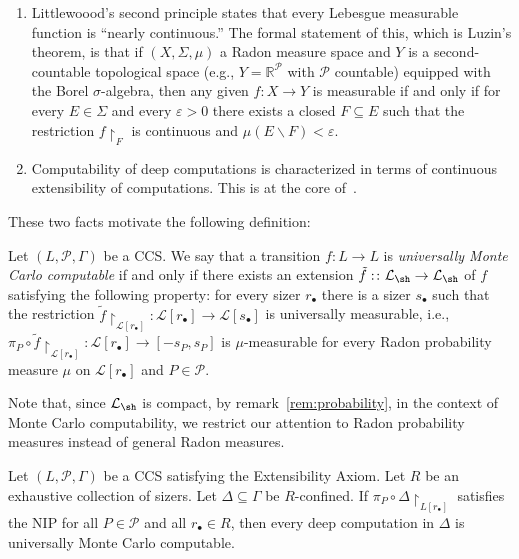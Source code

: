 \begin{enumerate}
    \item Littlewoood's second principle states that every Lebesgue measurable function is ``nearly continuous.''
The formal statement of this, which is Luzin's theorem, is that if $(X,\Sigma ,\mu )$ a Radon measure space and $Y$ is a second-countable topological space (e.g., $Y=\mathbb{R}^\mathcal{P}$ with $\mathcal{P}$ countable) equipped with the Borel $\sigma$-algebra, then any given $f:X\to Y$ is measurable if and only if for every $E\in\Sigma$ and every $\varepsilon>0$ there exists a closed $F\subseteq E$ such that the restriction $f\restriction_F$ is continuous and $\mu(E\backslash F) < \varepsilon$.

    \item Computability of deep computations is characterized in terms of continuous extensibility of computations.
    This is at the core of~\cite{alva2024approximability}.
\end{enumerate}

These two facts motivate the following definition:

\begin{definition}\label{def:universally-essentially-computable}
    Let $(L,\mathcal{P},\Gamma)$ be a CCS.
    We say that a transition $f\colon L\to L$ is \emph{universally Monte Carlo computable} if and only if there exists an extension $\tilde f:\colon\mathcal{L}_{\sh}\to \mathcal{L}_{\sh}$ of $f$ satisfying the following property: for every sizer $r_\bullet$ there is a sizer $s_\bullet$ such that the restriction $\tilde f\restriction_{\mathcal{L}[r_{\bullet}]}\colon\mathcal{L}[r_\bullet]\to\mathcal{L}[s_\bullet]$ is universally measurable, i.e., $\pi_P\circ \tilde f\restriction_{\mathcal{L}[r_{\bullet}]}\colon \mathcal{L}[r_\bullet]\to [-s_P,s_P]$ is $\mu$-measurable for every Radon probability measure $\mu$ on $\mathcal{L}[r_\bullet]$ and $P\in\mathcal{P}$.
\end{definition}

Note that, since $\mathcal{L}_{\sh}$ is compact, by remark~\ref{rem:probability}, in the context of Monte Carlo computability, we restrict our attention to Radon probability measures instead of general Radon measures.

\begin{theorem}\label{thm:NIP-Monte-Carlo}
    Let $(L,\mathcal{P},\Gamma)$ be a CCS satisfying the Extensibility Axiom.
    Let $R$ be an exhaustive collection of sizers.
    Let $\Delta\subseteq\Gamma$ be $R$-confined.
    If $\pi_P\circ\Delta\restriction_{L[r_\bullet]}$ satisfies the NIP for all $P\in\mathcal{P}$ and all $r_{\bullet}\in R$, then every deep computation in $\Delta$ is universally Monte Carlo computable.
\end{theorem}

